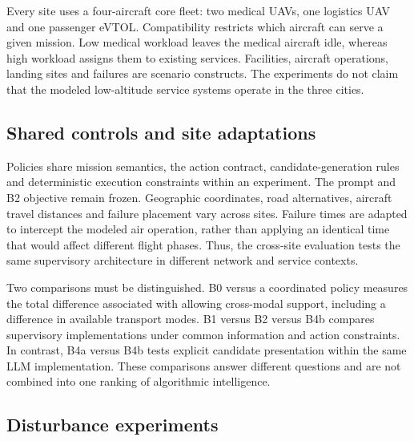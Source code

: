 \documentclass[]{interact}
\theoremstyle{plain}
\theoremstyle{definition}
\theoremstyle{remark}
\begin{document}
Every site uses a four-aircraft core fleet: two medical UAVs, one logistics UAV and one passenger eVTOL. Compatibility restricts which aircraft can serve a given mission. Low medical workload leaves the medical aircraft idle, whereas high workload assigns them to existing services. Facilities, aircraft operations, landing sites and failures are scenario constructs. The experiments do not claim that the modeled low-altitude service systems operate in the three cities.

\subsection{Shared controls and site adaptations}

Policies share mission semantics, the action contract, candidate-generation rules and deterministic execution constraints within an experiment. The prompt and B2 objective remain frozen. Geographic coordinates, road alternatives, aircraft travel distances and failure placement vary across sites. Failure times are adapted to intercept the modeled air operation, rather than applying an identical time that would affect different flight phases. Thus, the cross-site evaluation tests the same supervisory architecture in different network and service contexts.

Two comparisons must be distinguished. B0 versus a coordinated policy measures the total difference associated with allowing cross-modal support, including a difference in available transport modes. B1 versus B2 versus B4b compares supervisory implementations under common information and action constraints. In contrast, B4a versus B4b tests explicit candidate presentation within the same LLM implementation. These comparisons answer different questions and are not combined into one ranking of algorithmic intelligence.

\subsection{Disturbance experiments}
\end{document}
